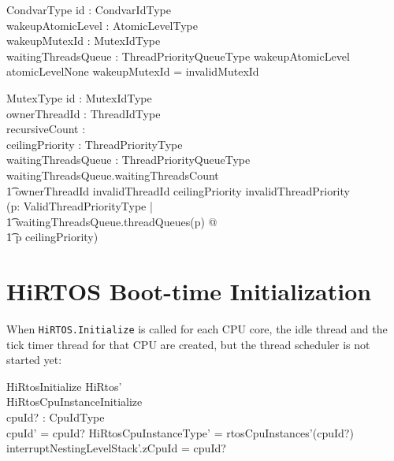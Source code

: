 \documentclass[11pt,letterpaper,twoside,openany]{book}
\begin{document}
\begin{schema}{CondvarType}
   id : CondvarIdType \\
   wakeupAtomicLevel : AtomicLevelType \\
   wakeupMutexId : MutexIdType \\
   waitingThreadsQueue : ThreadPriorityQueueType
\where
   wakeupAtomicLevel \neq atomicLevelNone \implies wakeupMutexId = invalidMutexId
\end{schema}

\begin{schema}{MutexType}
   id : MutexIdType \\
   ownerThreadId : ThreadIdType \\
   recursiveCount : \nat \\
   ceilingPriority : ThreadPriorityType \\
   waitingThreadsQueue : ThreadPriorityQueueType
\where
   waitingThreadsQueue.waitingThreadsCount  \implies \\
   \t1 ownerThreadId \neq invalidThreadId
\also
   ceilingPriority \neq invalidThreadPriority \implies \\
   (\forall p: ValidThreadPriorityType | \\
   \t1     waitingThreadsQueue.threadQueues(p) \neq \emptyset @ \\
   \t1     p \leq ceilingPriority)
\end{schema}

\section{HiRTOS Boot-time Initialization}

When \verb`HiRTOS.Initialize` is called for each CPU core, the idle thread
and the tick timer thread for that CPU are created, but the thread
scheduler is not started yet:

\begin{schema}{HiRtosInitialize}
   HiRtos' \\
   HiRtosCpuInstanceInitialize \\
   cpuId? : CpuIdType \\
\where
   cpuId' = cpuId?
\also
   \theta HiRtosCpuInstanceType' = rtosCpuInstances'(cpuId?)
\also
   interruptNestingLevelStack'.zCpuId = cpuId?
\end{schema}
\end{document}
